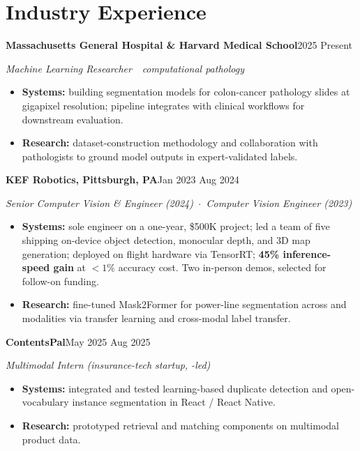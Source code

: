 \documentclass[10pt,letterpaper]{article}
\newcommand{\sansfam}{\sffamily}
\newcommand{\bdash}{\,\textemdash\,}
\newcommand{\datestamp}[1]{{\sansfam\footnotesize\color{meta}\figureversion{lf}#1}}
\newcommand{\role}[2]{%
  \filbreak%
  \par\vspace{1pt}%
  \noindent\textbf{#1}\hfill\datestamp{#2}\par\nopagebreak}
\newcommand{\sub}[1]{\noindent\textit{\footnotesize\color{meta} #1}\par\nopagebreak}
\newcommand{\acro}[1]{\textls[80]{#1}}
\begin{document}
\section{Industry Experience}

\role{Massachusetts General Hospital \& Harvard Medical School}{2025 \textendash{} Present}
\sub{Machine Learning Researcher \bdash{} computational pathology}
\begin{itemize}
  \item \textbf{Systems:} building segmentation models for colon-cancer pathology slides at gigapixel resolution; pipeline integrates with clinical workflows for downstream evaluation.
  \item \textbf{Research:} dataset-construction methodology and collaboration with pathologists to ground model outputs in expert-validated labels.
\end{itemize}

\role{KEF Robotics, Pittsburgh, PA}{Jan 2023 \textendash{} Aug 2024}
\sub{Senior Computer Vision \& \acro{ML} Engineer (2024) \,$\cdot$\, Computer Vision Engineer (2023)}
\begin{itemize}
  \item \textbf{Systems:} sole \acro{ML} engineer on a one-year, \$500K project; led a team of five shipping on-device object detection, monocular depth, and 3D map generation; deployed on flight hardware via TensorRT; \textbf{45\% inference-speed gain} at $<\!1\%$ accuracy cost. Two in-person demos, selected for follow-on funding.
  \item \textbf{Research:} fine-tuned Mask2Former for power-line segmentation across \acro{RGB} and \acro{IR} modalities via transfer learning and cross-modal label transfer.
\end{itemize}

\role{ContentsPal}{May 2025 \textendash{} Aug 2025}
\sub{Multimodal \acro{AI} Intern (insurance-tech startup, \acro{MIT}-led)}
\begin{itemize}
  \item \textbf{Systems:} integrated and tested learning-based duplicate detection and open-vocabulary instance segmentation in React / React Native.
  \item \textbf{Research:} prototyped retrieval and matching components on multimodal product data.
\end{itemize}
\end{document}
